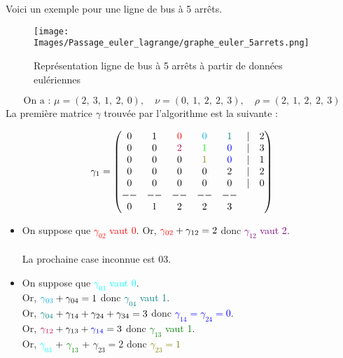 \documentclass[12pt]{article}
\begin{document}
Voici un exemple pour une ligne de bus à 5 arrêts.\\
\begin{figure}[H]
    \centering
    \texttt{[image: Images/Passage\_euler\_lagrange/graphe\_euler\_5arrets.png]}
    \caption{Représentation ligne de bus à 5 arrêts à partir de données eulériennes}
    \label{fig:graphe_5arrets}
\end{figure}
\[ \text{On a : }
\mu = (2,\:3,\:1,\:2,\:0), \quad \nu = (0,\:1,\:2,\:2,\:3), \quad \rho = (2,\:1,\:2,\:2,\:3)
\]
La première matrice $\gamma$ trouvée par l'algorithme est la suivante :\\

\begin{minipage}{.1\textwidth}%
\begin{adjustwidth}{-2cm}{-1cm}

 \[\gamma_1 = 
\begin{pmatrix}
0 & 1 & \textcolor{red}{0} & \textcolor{cyan}{0} & \textcolor{teal}{1} & | & 2 \\
0 & 0 & \textcolor{purple}{2} & \textcolor{green}{1} & \textcolor{blue}{0} & | & 3 \\
0 & 0 & 0 & \textcolor{olive}{1} & \textcolor{blue}{0}& | & 1\\
0 & 0 & 0 & 0 & 2 & | &  2\\
0 & 0 & 0 & 0 & 0 & | &  0\\
--&--&--&--&--\\
0 & 1 & 2 & 2 & 3 
\end{pmatrix}\]
\end{adjustwidth}
\end{minipage}%
\hfill
\begin{minipage}{0.6\textwidth}%
\begin{itemize}
    \item On suppose que \textcolor{red}{$\gamma_{02}$ vaut 0}. Or, $\textcolor{red}{\gamma_{02}} + \gamma_{12} = 2$ donc \textcolor{purple}{$\gamma_{12}$ vaut 2}.\\
    \\
    La prochaine case inconnue est 03.
    \item On suppose que \textcolor{cyan}{$\gamma_{03}$ vaut 0}.\\
    Or, $\textcolor{cyan}{\gamma_{03}} + \gamma_{04} = 1 $ donc \textcolor{teal}{$\gamma_{04}$ vaut 1}.\\
    Or, $\textcolor{teal}{\gamma_{04}} + \gamma_{14} + \gamma_{24} + \gamma_{34} = 3$ donc \textcolor{blue}{$\gamma_{14} = \gamma_{24} = 0$}.\\
    Or, $\textcolor{purple}{\gamma_{12}} + \gamma_{13} + \textcolor{blue}{\gamma_{14}} = 3$ donc \textcolor{green}{$\gamma_{13}$ vaut 1}.\\
    Or, \textcolor{cyan}{$\gamma_{03}$} + \textcolor{green}{$\gamma_{13}$} + $\gamma_{23} = 2$ donc \textcolor{olive}{$\gamma_{23} = 1$}
\end{itemize}
\end{minipage}%
\end{document}

